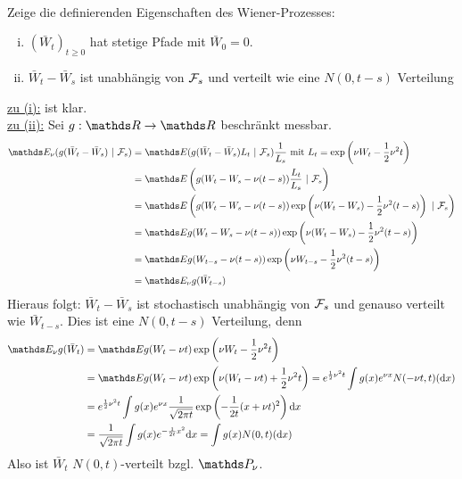 \\
Zeige die definierenden Eigenschaften des Wiener-Prozesses:
\begin{enumerate}[(i)]
	\item $(\bar{W}_t)_{t\ge 0}$ hat stetige Pfade mit $\bar{W}_0=0$.
	\item $\bar{W}_t-\bar{W}_s$ ist unabhängig von $\mathcal{F}_s$ und verteilt wie eine $N(0,t-s)$ Verteilung
\end{enumerate}
\uline{zu (i):}
ist klar.\\
\uline{zu (ii):}
Sei $g:\R\to\R$ beschränkt messbar.
\begin{equation*}
\begin{aligned}
	\E_\nu (g(\bar{W}_t-\bar{W}_s)~|~\F_s) &= \E (g(\bar{W}_t-\bar{W}_s)L_t~|~\F_s)\frac{1}{L_s} \text{ mit } L_t=\exp\enbrace{\nu W_t-\frac{1}{2}\nu^2t}\\
	&= \E\enbrace{g(W_t-W_s-\nu(t-s))\frac{L_t}{L_s}~|~\F_s}\\
	&= \E\enbrace{g(W_t-W_s-\nu(t-s))\exp\enbrace{\nu(W_t-W_s)-\frac{1}{2}\nu^2(t-s)}~|~\F_s}\\
	&= \E g(W_t-W_s-\nu(t-s))\exp\enbrace{\nu(W_t-W_s)-\frac{1}{2}\nu^2(t-s)}\\
	&= \E g(W_{t-s}-\nu(t-s))\exp\enbrace{\nu W_{t-s}-\frac{1}{2}\nu^2(t-s)}\\
	&= \E_\nu g(\bar{W}_{t-s})
\end{aligned}
\end{equation*}
Hieraus folgt: $\bar{W}_t-\bar{W}_s$ ist stochastisch unabhängig von $\mathcal{F}_s$ und genauso verteilt wie $\bar{W}_{t-s}$.
Dies ist eine $N(0,t-s)$ Verteilung, denn
\begin{equation*}
\begin{aligned}
	\E_\nu g(\bar{W}_t) &= \E g(W_t-\nu t)\exp\enbrace{\nu W_t-\frac{1}{2}\nu^2 t}\\
	&= \E g(W_t-\nu t)\exp\enbrace{\nu (W_t-\nu t)+\frac{1}{2}\nu^2t} = e^{\frac{1}{2}\nu^2t}\int g(x)e^{\nu x}N(-\nu t,t)(\dint x)\\
	&= e^{\frac{1}{2}\nu^2t}\int g(x)e^{\nu x}\frac{1}{\sqrt{2\pi t}}\exp\enbrace{-\frac{1}{2t}(x+\nu t)^2}\dint x\\
	&= \frac{1}{\sqrt{2\pi t}}\int g(x)e^{-\frac{1}{2t}x^2}\dint x = \int g(x)N(0,t)(\dint x)
\end{aligned}
\end{equation*}
Also ist $ \bar{W}_t$ $N(0,t)$-verteilt bzgl. $\Pw_\nu$.

